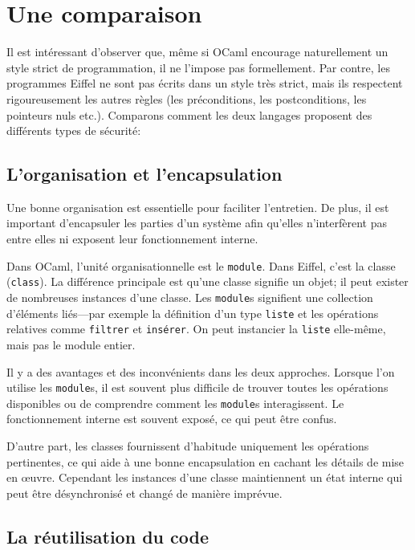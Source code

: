 \documentclass[french]{report}
\begin{document}
\chapter{Une comparaison}

Il est intéressant d'observer que, même si OCaml encourage naturellement un style strict de programmation, il ne l'impose pas formellement. Par contre, les programmes Eiffel ne sont pas écrits dans un style très strict, mais ils respectent rigoureusement les autres règles (les préconditions, les postconditions, les pointeurs nuls etc.). Comparons comment les deux langages proposent des différents types de sécurité:

\section{L'organisation et l'encapsulation}

Une bonne organisation est essentielle pour faciliter l'entretien. De plus, il est important d'encapsuler les parties d'un système afin qu'elles n'interfèrent pas entre elles ni exposent leur fonctionnement interne.

Dans OCaml, l'unité organisationnelle est le \texttt{module}. Dans Eiffel, c'est la classe (\texttt{class}). La différence principale est qu'une classe signifie un objet; il peut exister de nombreuses instances d'une classe. Les \texttt{module}s signifient une collection d'éléments liés---par exemple la définition d'un type \texttt{liste} et les opérations relatives comme \texttt{filtrer} et \texttt{insérer}. On peut instancier la \texttt{liste} elle-même, mais pas le module entier.

Il y a des avantages et des inconvénients dans les deux approches. Lorsque l'on utilise les \texttt{module}s, il est souvent plus difficile de trouver toutes les opérations disponibles ou de comprendre comment les \texttt{module}s interagissent. Le fonctionnement interne est souvent exposé, ce qui peut être confus.

D'autre part, les classes fournissent d'habitude uniquement les opérations pertinentes, ce qui aide à une bonne encapsulation en cachant les détails de mise en œuvre. Cependant les instances d'une classe maintiennent un état interne qui peut être désynchronisé et changé de manière imprévue.

\section{La réutilisation du code}
\end{document}
